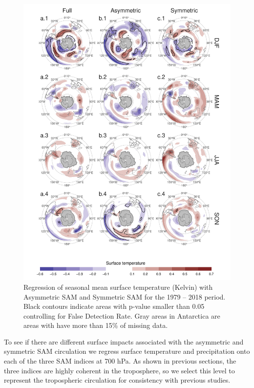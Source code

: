\documentclass[smallextended]{svjour3}       %
\begin{document}
\begin{figure}
\includegraphics{regr-air-season-1} \caption{Regression of seasonal mean surface temperature (Kelvin) with Asymmetric SAM and Symmetric SAM for the 1979 -- 2018 period. Black contours indicate areas with p-value smaller than 0.05 controlling for False Detection Rate. Gray areas in Antarctica are areas with have more than 15\% of missing data.}\label{fig:regr-air-season}
\end{figure}

To see if there are different surface impacts associated with the asymmetric and symmetric SAM circulation we regress surface temperature and precipitation onto each of the three SAM indices at 700 hPa. As shown in previous sections, the three indices are highly coherent in the troposphere, so we select this level to represent the tropospheric circulation for consistency with previous studies.
\end{document}
